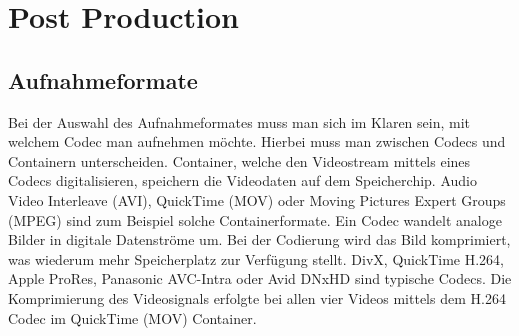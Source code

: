 \section{Post Production}
\subsection{Aufnahmeformate}
Bei der Auswahl des Aufnahmeformates muss man sich im Klaren sein, mit welchem Codec man aufnehmen möchte. Hierbei muss man zwischen Codecs und Containern unterscheiden. Container, welche den Videostream mittels eines Codecs digitalisieren, speichern die Videodaten auf dem Speicherchip. Audio Video Interleave (AVI), QuickTime (MOV) oder Moving Pictures Expert Groups (MPEG) sind zum Beispiel solche Containerformate. Ein Codec wandelt analoge Bilder in digitale Datenströme um. Bei der Codierung wird das Bild komprimiert, was wiederum mehr Speicherplatz zur Verfügung stellt. DivX, QuickTime H.264, Apple ProRes, Panasonic AVC-Intra oder Avid DNxHD sind typische Codecs.\citep{aufnahmeformate}\newline
Die Komprimierung des Videosignals erfolgte bei allen vier Videos mittels dem H.264 Codec im QuickTime (MOV) Container. 
